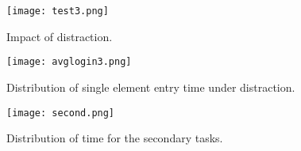 \documentclass[12pt,a4paper,oneside]{report}
\begin{document}
\begin{figure}[H]
    \begin{center}
        \label{abc}
            \texttt{[image: test3.png]}
            \caption{ Impact of distraction.}
    \end{center}
\end{figure}

\begin{figure}[H]
    \begin{center}
        \label{abc}
            \texttt{[image: avglogin3.png]}
            \caption{ Distribution of single element entry time under distraction.}
    \end{center}
\end{figure}

\begin{figure}[H]
    \begin{center}
        \label{abc}
            \texttt{[image: second.png]}
            \caption{  Distribution of time for the secondary tasks.}
    \end{center}
\end{figure}
\end{document}

